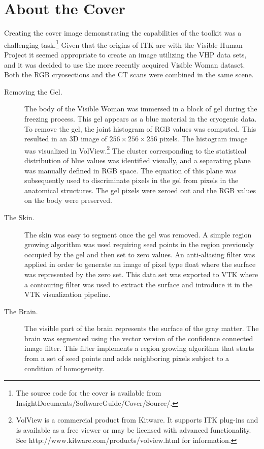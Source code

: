 \small

\chapter*{About the Cover}

Creating the cover image demonstrating the capabilities of the toolkit was a
challenging task.\footnote{The source code for the cover is available from
InsightDocuments/SoftwareGuide/Cover/Source/.} Given that the origins of ITK
are with the Visible Human Project it seemed appropriate to create an image
utilizing the VHP data sets, and it was decided to use the more recently
acquired Visible Woman dataset.  Both the RGB cryosections and the CT scans
were combined in the same scene.

\begin{description}

\item [Removing the Gel.]
The body of the Visible Woman was immersed in a block of gel during the
freezing process. This gel appears as a blue material in the cryogenic data.
To remove the gel, the joint histogram of RGB values was computed. This
resulted in an 3D image of $256\times256\times256$ pixels. The histogram
image was visualized in VolView.\footnote{VolView is a commercial product
from Kitware. It supports ITK plug-ins and is available as a free viewer or
may be licensed with advanced functionality. See
http://www.kitware.com/products/volview.html for information.} The cluster
corresponding to the statistical distribution of blue values was identified
visually, and a separating plane was manually defined in RGB space. The
equation of this plane was subsequently used to discriminate pixels in the
gel from pixels in the anatomical structures. The gel pixels were zeroed out
and the RGB values on the body were preserved.

\item[The Skin.]
The skin was easy to segment once the gel was removed. A simple region
growing algorithm was used requiring seed points in the region previously
occupied by the gel and then set to zero values. An anti-aliasing filter was
applied in order to generate an image of pixel type float where the surface
was represented by the zero set. This data set was exported to VTK where a
contouring filter was used to extract the surface and introduce it in the VTK
visualization pipeline.

\item[The Brain.]
The visible part of the brain represents the surface of the gray matter.  The
brain was segmented using the vector version of the confidence connected
image filter.  This filter implements a region growing algorithm that starts
from a set of seed points and adds neighboring pixels subject to a condition
of homogeneity.


\end{description}
